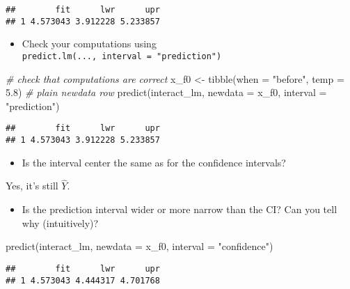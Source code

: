 \documentclass[
  oneside]{book}
\newenvironment{Shaded}{\begin{snugshade}}{\end{snugshade}}
\newcommand{\AttributeTok}[1]{\textcolor[rgb]{0.77,0.63,0.00}{#1}}
\newcommand{\CommentTok}[1]{\textcolor[rgb]{0.56,0.35,0.01}{\textit{#1}}}
\newcommand{\FloatTok}[1]{\textcolor[rgb]{0.00,0.00,0.81}{#1}}
\newcommand{\FunctionTok}[1]{\textcolor[rgb]{0.00,0.00,0.00}{#1}}
\newcommand{\NormalTok}[1]{#1}
\newcommand{\OtherTok}[1]{\textcolor[rgb]{0.56,0.35,0.01}{#1}}
\newcommand{\StringTok}[1]{\textcolor[rgb]{0.31,0.60,0.02}{#1}}
\providecommand{\tightlist}{%
  \setlength{\itemsep}{0pt}\setlength{\parskip}{0pt}}
\begin{document}
\begin{verbatim}
##        fit      lwr      upr
## 1 4.573043 3.912228 5.233857
\end{verbatim}

\begin{itemize}
\tightlist
\item
  Check your computations using \texttt{predict.lm(...,\ interval\ =\ "prediction")}
\end{itemize}

\begin{Shaded}
\begin{Highlighting}[]
\CommentTok{\# check that computations are correct}
\NormalTok{x\_f0 }\OtherTok{\textless{}{-}} \FunctionTok{tibble}\NormalTok{(}\AttributeTok{when =} \StringTok{"before"}\NormalTok{, }\AttributeTok{temp =} \FloatTok{5.8}\NormalTok{) }\CommentTok{\# plain newdata row}
\FunctionTok{predict}\NormalTok{(interact\_lm, }\AttributeTok{newdata =}\NormalTok{ x\_f0, }\AttributeTok{interval =} \StringTok{"prediction"}\NormalTok{)}
\end{Highlighting}
\end{Shaded}

\begin{verbatim}
##        fit      lwr      upr
## 1 4.573043 3.912228 5.233857
\end{verbatim}

\begin{itemize}
\tightlist
\item
  Is the interval center the same as for the confidence intervals?
\end{itemize}

Yes, it's still \(\hat Y\).

\begin{itemize}
\tightlist
\item
  Is the prediction interval wider or more narrow than the CI? Can you tell why (intuitively)?
\end{itemize}

\begin{Shaded}
\begin{Highlighting}[]
\FunctionTok{predict}\NormalTok{(interact\_lm, }\AttributeTok{newdata =}\NormalTok{ x\_f0, }\AttributeTok{interval =} \StringTok{"confidence"}\NormalTok{)}
\end{Highlighting}
\end{Shaded}

\begin{verbatim}
##        fit      lwr      upr
## 1 4.573043 4.444317 4.701768
\end{verbatim}
\end{document}
